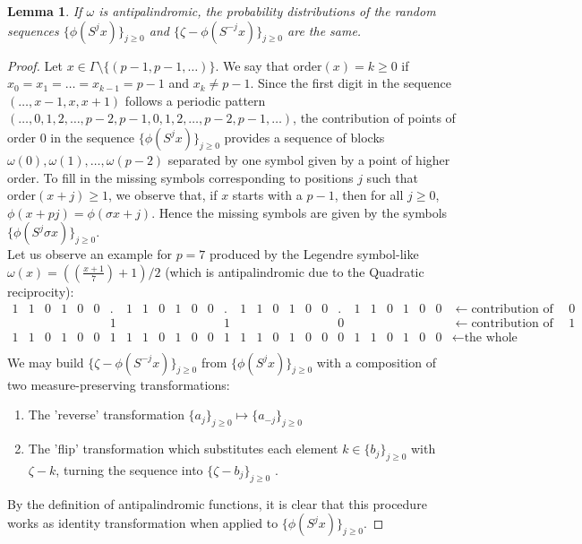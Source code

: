 \documentclass[a4paper]{article}
\theoremstyle{plain}
\newtheorem{lemma}{Lemma}[section]
\theoremstyle{definition}
\begin{document}
\begin{lemma}  \label{distLemma}
If $\omega$ is antipalindromic, the probability distributions of the random sequences $\{\phi(S^j x)\}_{j \ge 0}$ and $\{ \zeta - \phi(S^{-j} x)\}_{j \ge 0}$ are the same.
\end{lemma}
\begin{proof}
Let $x \in \Gamma \setminus \{(p-1,p-1,\ldots)\}$. We
say that $\mathrm{order}(x) = k \ge 0$ if $x_0=x_1=\ldots=x_{k-1}=p-1$ and $x_k \ne p-1$.
Since the first digit in the sequence $(\ldots, x-1,x,x+1)$ follows a periodic pattern
$(\ldots, 0, 1, 2, \ldots,p-2, p-1, 0, 1, 2, \ldots,p-2, p-1, \ldots)$, the contribution of points of order $0$ in the sequence
$\{\phi(S^j x)\}_{j \ge 0}$ provides a sequence of blocks $\omega(0),\omega(1),\ldots, \omega(p-2)$ separated by one symbol
given by a point of higher order. To fill in the missing symbols corresponding to positions $j$ 
such that $\mathrm{order}(x+j) \ge 1$, we observe that, if $x$ starts with a $p-1$, then for all $j \ge 0$, $\phi(x+pj)=\phi(\sigma x + j)$. Hence the missing symbols are given by the symbols $\{\phi(S^j \sigma x)\}_{j \ge 0}$.\\
Let us observe an example for $p=7$ produced by the Legendre symbol-like $\omega(x)=((\frac{x+1}{7}) + 1)/2$ (which is antipalindromic due to the Quadratic reciprocity):\bigskip\\
$\begin{array}{cccccccccccccccccccccccccccl}
1 & 1 & 0 & 1 & 0 & 0 & . & 1 & 1 & 0 & 1 & 0 & 0 &. & 1 & 1 & 0 & 1 & 0 & 0 & . & 1 & 1 & 0 & 1 & 0 & 0 &\leftarrow \text{contribution of order }0 \\
  &   &   &   &   &   & 1 &   &   &   &   &   &   &1 &   &   &   &   &   &   & 0 &   &   &   &   &   &   &\leftarrow \text{contribution of order }1 \\
1 & 1 & 0 & 1 & 0 & 0 & 1 & 1 & 1 & 0 & 1 & 0 & 0 & 1 & 1 & 1 & 0 & 1 & 0 & 0 & 0 & 1 & 1 & 0 & 1 & 0 & 0 &\leftarrow \text{the whole sequence} \\
\end{array}$
\bigskip\\
We may build $\{ \zeta - \phi(S^{-j} x)\}_{j \ge 0}$ from $\{\phi(S^j x)\}_{j \ge 0}$ with a composition of two measure-preserving transformations:
\begin{enumerate}
\item The 'reverse' transformation  $\{a_j\}_{j \ge 0} \mapsto \{a_{-j}\}_{j \ge 0}$ 
\item The 'flip' transformation which substitutes each element $k \in \{b_j\}_{j \ge 0}$ with $\zeta-k$, turning the sequence into $\{ \zeta - b_j\}_{j \ge 0}$ .
\end{enumerate}
By the definition of antipalindromic functions, it is clear that this procedure works as identity transformation when applied to $\{\phi(S^j x)\}_{j \ge 0}$.
\end{proof}
\end{document}
